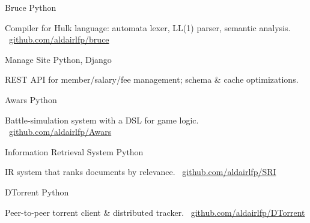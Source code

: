 \documentclass[]{awesome-cv}
\begin{document}
\begin{cventries}
	\vspace{-3mm}
	\cventry
	{}
	{Bruce \vspace{-5mm}}
	{Python \vspace{-5mm}}
	{}
	{\begin{cvsectionnormaltext}
			\item {Compiler for Hulk language: automata lexer, LL(1) parser, semantic analysis. \faLink\ \href{https://github.com/aldairlfp/bruce}{github.com/aldairlfp/bruce}
      }
		\end{cvsectionnormaltext}}

	\vspace{-3mm}
	\cventry
	{}
	{Manage Site \vspace{-5mm}}
	{Python, Django \vspace{-5mm}}
	{}
	{\begin{cvsectionnormaltext}
			\item{REST API for member/salary/fee management; schema \& cache optimizations.
      }
		\end{cvsectionnormaltext}}

	\vspace{-3mm}
	\cventry
	{}
	{Awars \vspace{-5mm}}
	{Python \vspace{-5mm}}
	{}
	{\begin{cvsectionnormaltext}
			\item{Battle-simulation system with a DSL for game logic. \faLink\ \href{https://github.com/aldairlfp/Awars}{github.com/aldairlfp/Awars}
      }
		\end{cvsectionnormaltext}}

	\vspace{-3mm}
	\cventry
	{}
	{Information Retrieval System \vspace{-5mm}}
	{Python \vspace{-5mm}}
	{}
	{\begin{cvsectionnormaltext}
			\item{IR system that ranks documents by relevance. \faLink\ \href{https://github.com/aldairlfp/SRI}{github.com/aldairlfp/SRI}
      }
		\end{cvsectionnormaltext}}

	\vspace{-3mm}
	\cventry
	{}
	{DTorrent \vspace{-5mm}}
	{Python \vspace{-5mm}}
	{}
	{\begin{cvsectionnormaltext}
			\item{ Peer-to-peer torrent client \& distributed tracker. \faLink\ \href{https://github.com/aldairlfp/DTorrent}{github.com/aldairlfp/DTorrent}
      }
		\end{cvsectionnormaltext}}


\end{cventries}
\end{document}
